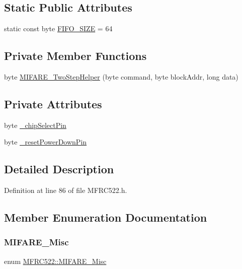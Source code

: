 \subsection*{Static Public Attributes}
\begin{DoxyCompactItemize}
\item 
static const byte \hyperlink{class_m_f_r_c522_a7bdf27d2122006aabd423ad71495e5f1}{F\+I\+F\+O\+\_\+\+S\+I\+ZE} = 64
\end{DoxyCompactItemize}
\subsection*{Private Member Functions}
\begin{DoxyCompactItemize}
\item 
byte \hyperlink{class_m_f_r_c522_a539a88f943326b5941aecf06433d9cac}{M\+I\+F\+A\+R\+E\+\_\+\+Two\+Step\+Helper} (byte command, byte block\+Addr, long data)
\end{DoxyCompactItemize}
\subsection*{Private Attributes}
\begin{DoxyCompactItemize}
\item 
byte \hyperlink{class_m_f_r_c522_affaa7030ec6e5984cce845a8ed6df1b2}{\+\_\+chip\+Select\+Pin}
\item 
byte \hyperlink{class_m_f_r_c522_a3885cb4bb582de0045cff2829d59006f}{\+\_\+reset\+Power\+Down\+Pin}
\end{DoxyCompactItemize}


\subsection{Detailed Description}


Definition at line 86 of file M\+F\+R\+C522.\+h.



\subsection{Member Enumeration Documentation}
\mbox{\label{class_m_f_r_c522_a92c17a5b83cc4fde3cc3454c03b8eede}} 
\subsubsection{\texorpdfstring{M\+I\+F\+A\+R\+E\+\_\+\+Misc}{MIFARE\_Misc}}
{\footnotesize\ttfamily enum \hyperlink{class_m_f_r_c522_a92c17a5b83cc4fde3cc3454c03b8eede}{M\+F\+R\+C522\+::\+M\+I\+F\+A\+R\+E\+\_\+\+Misc}}

